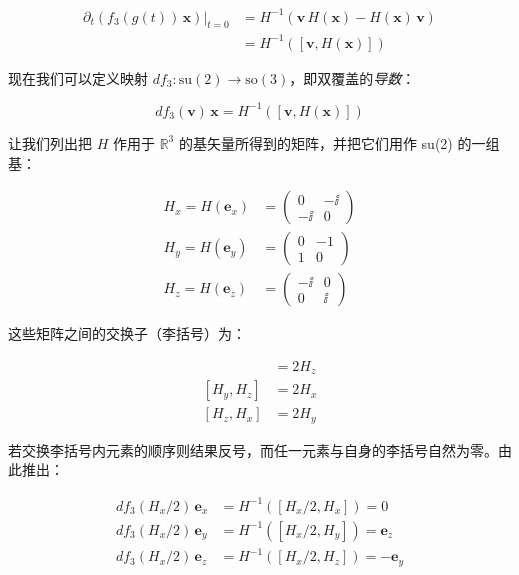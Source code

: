 \begin{align}
\left.\partial_t\!\left(f_3(g(t))\,\mathbf{x}\right)\right|_{t=0}
&= H^{-1}\!\left(\mathbf{v}\,H(\mathbf{x}) - H(\mathbf{x})\,\mathbf{v}\right) \\
&= H^{-1}\!\left([\mathbf{v},H(\mathbf{x})]\right)
\end{align}

现在我们可以定义映射 $df_3:\mathrm{su}(2)\to\mathrm{so}(3)$，即双覆盖的\emph{导数}：

\begin{equation}
df_3(\mathbf{v})\,\mathbf{x} = H^{-1}\!\left([\mathbf{v},H(\mathbf{x})]\right)
\end{equation}

让我们列出把 $H$ 作用于 $\mathbb{R}^{3}$ 的基矢量所得到的矩阵，并把它们用作 su(2) 的一组基：

\begin{align}
H_x = H(\mathbf{e}_x) &= \begin{pmatrix} 0 & -\ii \\ -\ii & 0 \end{pmatrix} \\
H_y = H(\mathbf{e}_y) &= \begin{pmatrix} 0 & -1 \\ 1 & 0 \end{pmatrix} \\
H_z = H(\mathbf{e}_z) &= \begin{pmatrix} -\ii & 0 \\ 0 & \ii \end{pmatrix}
\end{align}

这些矩阵之间的交换子（李括号）为：

\begin{align}
[H_x,H_y] &= 2H_z \\
[H_y,H_z] &= 2H_x \\
[H_z,H_x] &= 2H_y
\end{align}

若交换李括号内元素的顺序则结果反号，而任一元素与自身的李括号自然为零。由此推出：

\begin{align}
df_3(H_x/2)\,\mathbf{e}_x &= H^{-1}\!\left([H_x/2,H_x]\right) = 0 \\
df_3(H_x/2)\,\mathbf{e}_y &= H^{-1}\!\left([H_x/2,H_y]\right) = \mathbf{e}_z \\
df_3(H_x/2)\,\mathbf{e}_z &= H^{-1}\!\left([H_x/2,H_z]\right) = -\mathbf{e}_y
\end{align}

